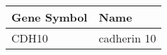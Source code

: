 \begin{tabular}{ll}
\toprule
Gene Symbol &        Name \\
\midrule
      CDH10 & cadherin 10 \\
\bottomrule
\end{tabular}
